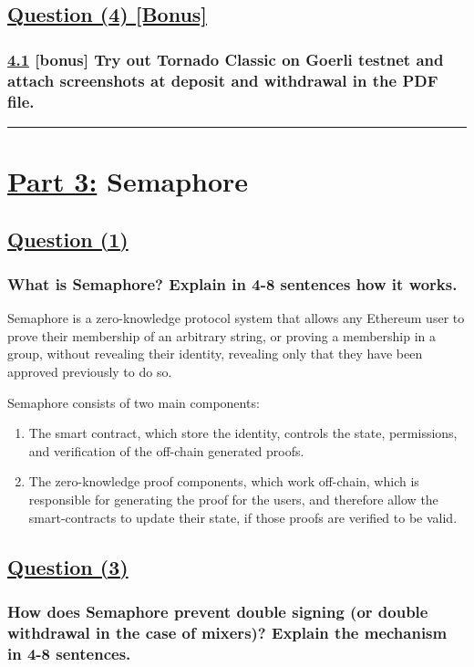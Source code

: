 \documentclass[letterpaper, 10 pt, conference]{ieeeconf}  %
\begin{document}
\subsection{\textbf{\underline{Question (4) [Bonus]}}}
\subsubsection{\textbf{\underline{4.1} [bonus] Try out Tornado Classic on Goerli testnet and attach screenshots at deposit and withdrawal in the PDF file.}}

\noindent\rule{8cm}{0.4pt}

\section{\textbf{\underline{Part 3:}} Semaphore}

\subsection{\textbf{}\underline{Question (1)}}
\subsubsection{\textbf{What is Semaphore? Explain in 4-8 sentences how it works.}}

Semaphore is a zero-knowledge protocol system that allows any Ethereum user to prove their membership of an arbitrary string, or proving a membership in a group, without revealing their identity, revealing only that they have been approved previously to do so. 

Semaphore consists of two main components: 
\begin{enumerate}
    \item The smart contract, which store the identity, controls the state, permissions, and verification of the off-chain generated proofs.
    \item The zero-knowledge proof components, which work off-chain, which is responsible for generating the proof for the users, and therefore allow the smart-contracts to update their state, if those proofs are verified to be valid. \cite{c2} \cite{c3}
\end{enumerate}

\subsection{\textbf{\underline{Question (3)}}}
\subsubsection{\textbf{How does Semaphore prevent double signing (or double withdrawal in the case of mixers)? Explain the mechanism in 4-8 sentences.}}
\end{document}
